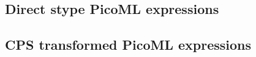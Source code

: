 \subsection{Direct stype PicoML expressions}



\newpage

\subsection{CPS transformed PicoML expressions}


